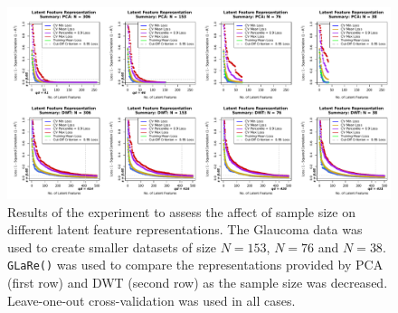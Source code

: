 \begin{figure}
    \centering
    \includegraphics[width=1\linewidth]{figures/eye-sample-size-results-results-01.pdf}
    \caption{Results of the experiment to assess the affect of sample size on different latent feature representations. The Glaucoma data was used to create smaller datasets of size $N=153$, $N=76$ and $N=38$. \texttt{GLaRe()} was used to compare the representations provided by PCA (first row) and DWT (second row) as the sample size was decreased. Leave-one-out cross-validation was used in all cases.}
    \label{fig:eye-sample-size-results-results-01}
\end{figure}